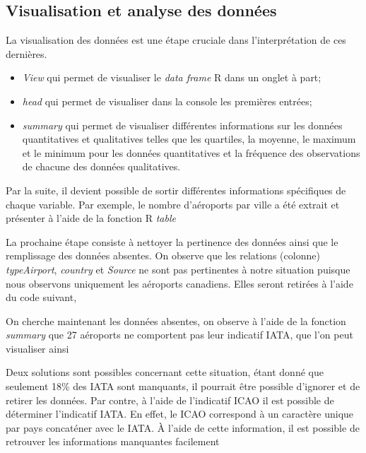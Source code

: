\subsection{Visualisation et analyse des données}

La visualisation des données est une étape cruciale dans l’interprétation de ces dernières. 

\begin{itemize}
\item \textit{View}\cite{Rfunction:View} qui permet de visualiser le \emph{data frame} R dans un onglet à part;
\item \textit{head} \cite{Rfunction:head} qui permet de visualiser dans la console les premières entrées;
\item \textit{summary}\cite{Rfunction:summary} qui permet de visualiser différentes informations sur les données quantitatives et qualitatives telles que les quartiles, la moyenne, le maximum et le minimum pour les données quantitatives  et la fréquence des observations de chacune des données qualitatives.
\end{itemize}
Par la suite, il devient possible de sortir différentes informations spécifiques de chaque variable. Par exemple, le nombre d'aéroports par ville a été extrait et présenter à l'aide de la fonction R \textit{table} \cite{Rfunction:table}
%
%


La prochaine étape consiste à nettoyer la pertinence des données ainsi que le remplissage des données absentes. On observe que les relations (colonne) \textit{typeAirport}, \textit{country} et \textit{Source} ne sont pas pertinentes à notre situation puisque nous observons uniquement les aéroports canadiens. Elles seront retirées à l'aide du code suivant,

%
%

On cherche maintenant les données absentes, on observe à l'aide de la fonction \emph{summary} que 27 aéroports ne comportent pas leur indicatif IATA, que l'on peut visualiser ainsi

%
%

Deux solutions sont possibles concernant cette situation, étant donné que seulement 18\% des IATA sont manquants, il pourrait être possible d'ignorer et de retirer les données. Par contre, à l'aide de l'indicatif ICAO il est possible de déterminer l'indicatif IATA. En effet, le ICAO correspond à un caractère unique par pays concaténer avec le IATA. À l'aide de cette information, il est possible de retrouver les informations manquantes facilement 

